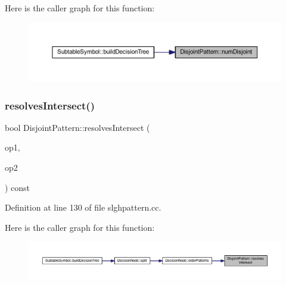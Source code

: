 Here is the caller graph for this function\+:
\nopagebreak
\begin{figure}[H]
\begin{center}
\leavevmode
\includegraphics[width=350pt]{class_disjoint_pattern_a33027f50347c5d747a8a473974db466f_icgraph}
\end{center}
\end{figure}
\mbox{\label{class_disjoint_pattern_adda87f504c1a2673096406f78c6f62b8}} 
\subsubsection{\texorpdfstring{resolvesIntersect()}{resolvesIntersect()}}
{\footnotesize\ttfamily bool Disjoint\+Pattern\+::resolves\+Intersect (\begin{DoxyParamCaption}\item[{const \mbox{\hyperlink{class_disjoint_pattern}{Disjoint\+Pattern}} $\ast$}]{op1,  }\item[{const \mbox{\hyperlink{class_disjoint_pattern}{Disjoint\+Pattern}} $\ast$}]{op2 }\end{DoxyParamCaption}) const}



Definition at line 130 of file slghpattern.\+cc.

Here is the caller graph for this function\+:
\nopagebreak
\begin{figure}[H]
\begin{center}
\leavevmode
\includegraphics[width=350pt]{class_disjoint_pattern_adda87f504c1a2673096406f78c6f62b8_icgraph}
\end{center}
\end{figure}
\mbox{\label{class_disjoint_pattern_aa9478beedbed7edf2dce73b2e8f0400d}} 
